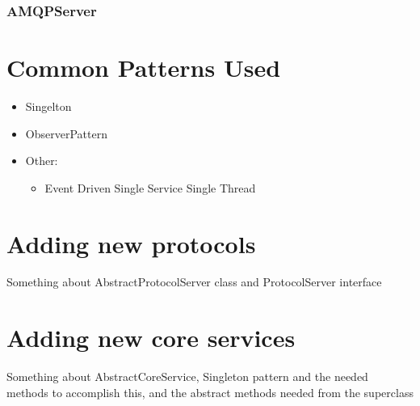 \subsubsection{AMQPServer}

\section{Common Patterns Used}

\begin{itemize}
\item Singelton
\item ObserverPattern
\item Other: \begin{itemize}
\item Event Driven Single Service Single Thread
\end{itemize}
\end{itemize}

\section{Adding new protocols}

Something about AbstractProtocolServer class and ProtocolServer interface

\section{Adding new core services}

Something about AbstractCoreService, Singleton pattern and the needed methods to accomplish this, and the abstract methods needed from the superclass


\clearpage
